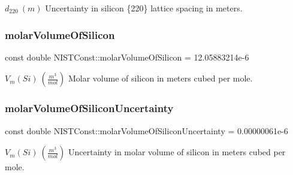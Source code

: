 $d_{220} \ (m)$ Uncertainty in silicon \{220\} lattice spacing in meters. \mbox{\label{group___n_i_s_t_const-_silicon_gaf084f6d4668f778d204cd782269f082c}} 
\subsubsection{\texorpdfstring{molar\+Volume\+Of\+Silicon}{molarVolumeOfSilicon}}
{\footnotesize\ttfamily const double N\+I\+S\+T\+Const\+::molar\+Volume\+Of\+Silicon = 12.\+05883214e-\/6}

$V_m(Si) \ (\frac{m^3}{mol})$ Molar volume of silicon in meters cubed per mole. \mbox{\label{group___n_i_s_t_const-_silicon_ga35b10008977416da18242a7e7808fc0d}} 
\subsubsection{\texorpdfstring{molar\+Volume\+Of\+Silicon\+Uncertainty}{molarVolumeOfSiliconUncertainty}}
{\footnotesize\ttfamily const double N\+I\+S\+T\+Const\+::molar\+Volume\+Of\+Silicon\+Uncertainty = 0.\+00000061e-\/6}

$V_m(Si) \ (\frac{m^3}{mol})$ Uncertainty in molar volume of silicon in meters cubed per mole. 